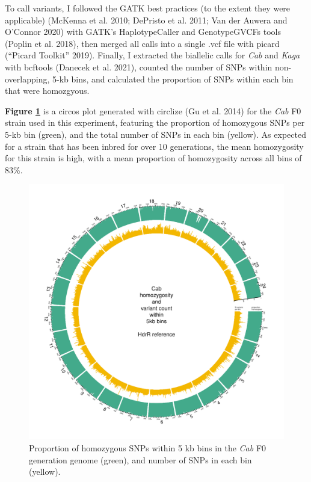 \documentclass[
]{book}
\begin{document}
To call variants, I followed the GATK best practices (to the extent they were applicable) (McKenna et al. 2010; DePristo et al. 2011; Van der Auwera and O'Connor 2020) with GATK's HaplotypeCaller and GenotypeGVCFs tools (Poplin et al. 2018), then merged all calls into a single .vcf file with picard ({``Picard Toolkit''} 2019). Finally, I extracted the biallelic calls for \emph{Cab} and \emph{Kaga} with bcftools (Danecek et al. 2021), counted the number of SNPs within non-overlapping, 5-kb bins, and calculated the proportion of SNPs within each bin that were homozgyous.

\textbf{Figure \ref{fig:somite-f0-cab}} is a circos plot generated with circlize (Gu et al. 2014) for the \emph{Cab} F0 strain used in this experiment, featuring the proportion of homozygous SNPs per 5-kb bin (green), and the total number of SNPs in each bin (yellow). As expected for a strain that has been inbred for over 10 generations, the mean homozygosity for this strain is high, with a mean proportion of homozygosity across all bins of 83\%.



\begin{figure}
\includegraphics[width=1\linewidth]{figs/somites/Cab} \caption{Proportion of homozygous SNPs within 5 kb bins in the \emph{Cab} F0 generation genome (green), and number of SNPs in each bin (yellow).}\label{fig:somite-f0-cab}
\end{figure}
\end{document}

